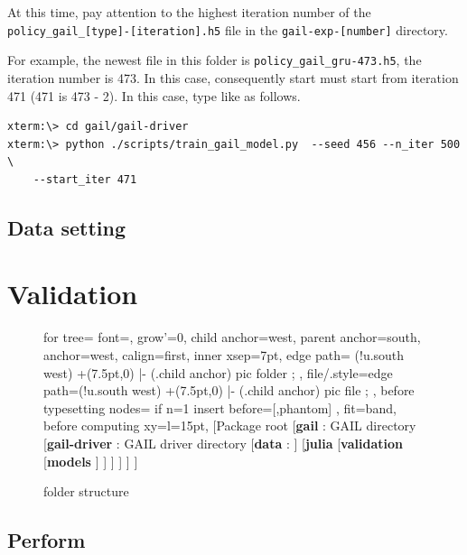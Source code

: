 \documentclass[openany,11pt]{report}%
\begin{document}
At this time, pay attention to the highest iteration number of the {\tt policy\_gail\_[type]-[iteration].h5} file in the {\tt gail-exp-[number]} directory.

For example, the newest file in this folder is {\tt policy\_gail\_gru-473.h5}, the iteration number is 473.
In this case, consequently start must start from iteration 471 (471 is 473 - 2).
In this case, type like as follows.

\begin{lstlisting}[style=DOS]
xterm:\> cd gail/gail-driver
xterm:\> python ./scripts/train_gail_model.py  --seed 456 --n_iter 500 \
    --start_iter 471
\end{lstlisting}



\subsection{Data setting}


\section{Validation}


\begin{figure}[H]
\begin{forest}
  for tree={
    font=\ttfamily,
    grow'=0,
    child anchor=west,
    parent anchor=south,
    anchor=west,
    calign=first,
    inner xsep=7pt,
    edge path={
      \noexpand{}
      (!u.south west) +(7.5pt,0) |- (.child anchor) pic {folder} ;
    },
    file/.style={edge path={\noexpand{}
          (!u.south west) +(7.5pt,0) |- (.child anchor) pic {file} ;}
    },
    before typesetting nodes={
      if n=1
        {insert before={[,phantom]}}
        {}
    },
    fit=band,
    before computing xy={l=15pt},
  }
[Package root
[{\bf gail} : GAIL directory
 [{\bf gail-driver} : GAIL driver directory
  [{\bf data} :
  ]
  [{\bf julia} 
   [{\bf validation} 
    [{\bf models} 
    ]
   ]
  ]
 ]
]
]
\end{forest}
  \caption{folder structure}
  \label{fig:folder_struct}
\end{figure}


\subsection{Perform}
\end{document}
